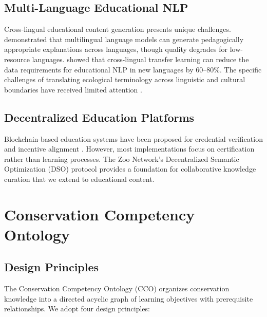 \documentclass[11pt,a4paper]{article}
\begin{document}
\subsection{Multi-Language Educational NLP}

Cross-lingual educational content generation presents unique challenges.
\citet{fan2021beyond} demonstrated that multilingual language models can generate pedagogically appropriate explanations across languages, though quality degrades for low-resource languages.
\citet{artetxe2020cross} showed that cross-lingual transfer learning can reduce the data requirements for educational NLP in new languages by 60--80\%.
The specific challenges of translating ecological terminology across linguistic and cultural boundaries have received limited attention \citep{maffi2005linguistic}.

\subsection{Decentralized Education Platforms}

Blockchain-based education systems have been proposed for credential verification \citep{grech2017blockchain} and incentive alignment \citep{sharples2016blockchain}.
However, most implementations focus on certification rather than learning processes.
The Zoo Network's Decentralized Semantic Optimization (DSO) protocol \citep{zoo2025dso} provides a foundation for collaborative knowledge curation that we extend to educational content.

\section{Conservation Competency Ontology}
\label{sec:ontology}

\subsection{Design Principles}

The Conservation Competency Ontology (CCO) organizes conservation knowledge into a directed acyclic graph of learning objectives with prerequisite relationships.
We adopt four design principles:
\end{document}
